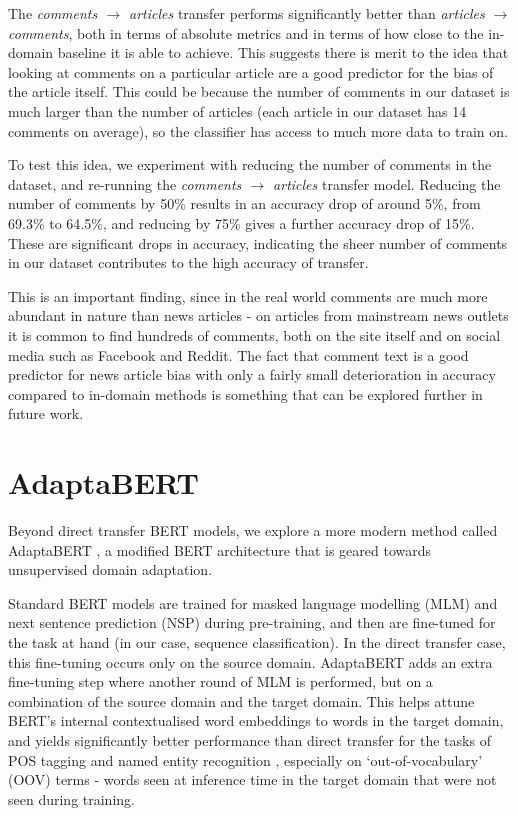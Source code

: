The \textit{comments $ \rightarrow $ articles} transfer performs significantly better than \textit{articles $ \rightarrow $ comments}, both in terms of absolute metrics and in terms of how close to the in-domain baseline it is able to achieve. This suggests there is merit to the idea that looking at comments on a particular article are a good predictor for the bias of the article itself. This could be because the number of comments in our dataset is much larger than the number of articles (each article in our dataset has 14 comments on average), so the classifier has access to much more data to train on.

To test this idea, we experiment with reducing the number of comments in the dataset, and re-running the \textit{comments $ \rightarrow $ articles} transfer model. Reducing the number of comments by 50\% results in an accuracy drop of around 5\%, from 69.3\% to 64.5\%, and reducing by 75\% gives a further accuracy drop of 15\%. These are significant drops in accuracy, indicating the sheer number of comments in our dataset contributes to the high accuracy of transfer.

This is an important finding, since in the real world comments are much more abundant in nature than news articles - on articles from mainstream news outlets it is common to find hundreds of comments, both on the site itself and on social media such as Facebook and Reddit. The fact that comment text is a good predictor for news article bias with only a fairly small deterioration in accuracy compared to in-domain methods is something that can be explored further in future work.

\section{AdaptaBERT} \label{sec:adaptabert}

Beyond direct transfer BERT models, we explore a more modern method called AdaptaBERT \cite{adaptabert}, a modified BERT architecture that is geared towards unsupervised domain adaptation.

Standard BERT models are trained for masked language modelling (MLM) and next sentence prediction (NSP) during pre-training, and then are fine-tuned for the task at hand (in our case, sequence classification). In the direct transfer case, this fine-tuning occurs only on the source domain. AdaptaBERT adds an extra fine-tuning step where another round of MLM is performed, but on a combination of the source domain and the target domain. This helps attune BERT's internal contextualised word embeddings to words in the target domain, and yields significantly better performance than direct transfer for the tasks of POS tagging and named entity recognition \cite{adaptabert}, especially on `out-of-vocabulary' (OOV) terms - words seen at inference time in the target domain that were not seen during training.

